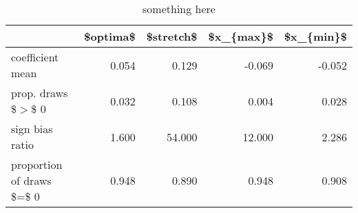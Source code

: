 \begin{table}[ht]
\centering
\begin{tabular}{lrrrr}
  \hline
  & \$optima\$ & \$stretch\$ & \$x\_\{max\}\$ & \$x\_\{min\}\$ \\ 
  \hline
coefficient mean & 0.054 & 0.129 & -0.069 & -0.052 \\ 
  prop. draws \$$>$\$ 0 & 0.032 & 0.108 & 0.004 & 0.028 \\ 
  sign bias ratio & 1.600 & 54.000 & 12.000 & 2.286 \\ 
  proportion of draws \$=\$ 0 & 0.948 & 0.890 & 0.948 & 0.908 \\ 
   \hline
\end{tabular}
\caption{something here} 
\end{table}
